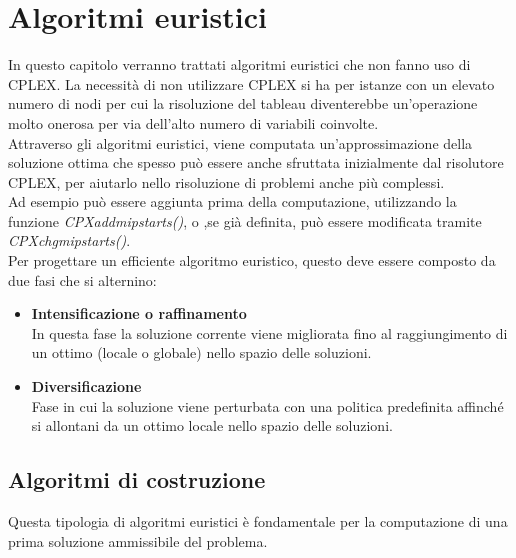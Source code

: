 \chapter{Algoritmi euristici}\label{HEURISTIC}
In questo capitolo verranno trattati algoritmi euristici che non fanno uso di CPLEX. La necessità di non utilizzare CPLEX si ha per istanze con un elevato numero di nodi per cui la risoluzione del tableau diventerebbe un'operazione molto onerosa per via dell'alto numero di variabili coinvolte.\\
Attraverso gli algoritmi euristici, viene computata un'approssimazione della soluzione ottima che spesso può essere anche sfruttata inizialmente dal risolutore CPLEX, per aiutarlo nello risoluzione di problemi anche più complessi.\\
Ad esempio può essere aggiunta prima della computazione, utilizzando la funzione \textit{CPXaddmipstarts()}, o ,se già definita, può essere modificata tramite \textit{CPXchgmipstarts()}.\\
Per progettare un efficiente algoritmo euristico, questo deve essere composto da due fasi che si alternino:
\begin{itemize}
\item{\textbf{Intensificazione o raffinamento}\\
In questa fase la soluzione corrente viene migliorata fino al raggiungimento di un ottimo (locale o globale) nello spazio delle soluzioni.
}
\item{\textbf{Diversificazione}\\
Fase in cui la soluzione viene perturbata con una politica predefinita affinché si allontani da un ottimo locale nello spazio delle soluzioni.
}
\end{itemize}


\section{Algoritmi di costruzione}\label{construction_alg}
Questa tipologia di algoritmi euristici è fondamentale per la computazione di una prima soluzione ammissibile del problema.

